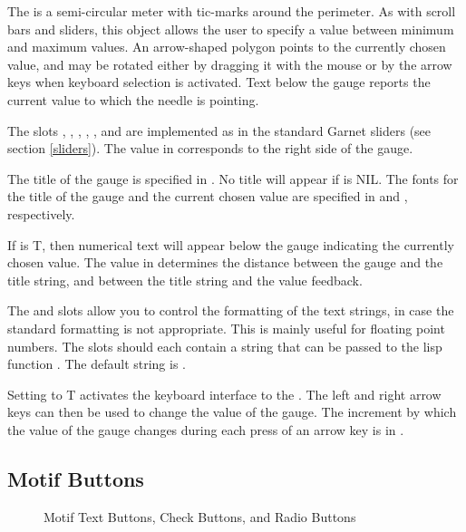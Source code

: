 \begin{center}
\end{center}

The  is a semi-circular meter with tic-marks around the
perimeter.  As with scroll bars and sliders, this object allows the user to
specify a value between minimum and maximum values.  An arrow-shaped polygon
points to the currently chosen value, and may be rotated either by dragging
it with the mouse or by the arrow keys when keyboard selection is activated.
Text below the gauge reports the current value to which the needle is pointing.

The slots , , , ,
, and  are implemented as in the standard Garnet
sliders (see section \ref{sliders}).  The value in  corresponds to
the right side of the gauge.

The title of the gauge is specified in .  No title will
appear if  is NIL.  The fonts for the title of the gauge
and the current chosen value are specified in  and
, respectively.

If  is T, then numerical text will appear below the
gauge indicating the currently chosen value.  The value in 
determines the distance between the gauge and the title string, and between
the title string and the value feedback.

The  and  slots allow you to
control the formatting of the text strings, in case the standard formatting
is not appropriate.  This is mainly useful for floating point numbers.
The slots should each contain a string that can be passed to the lisp function
.  The default string is .

Setting  to T activates the keyboard interface to
the .  The left and right arrow keys can then be used to
change the value of the gauge.  The increment by which the value of the gauge
changes during each press of an arrow key is in .




\begin{group}
\section{Motif Buttons}
\label{motif-buttons}

\begin{figure}
\begin{center}
\end{center}
\caption{Motif Text Buttons, Check Buttons, and Radio Buttons}
\end{figure}
\end{group}

